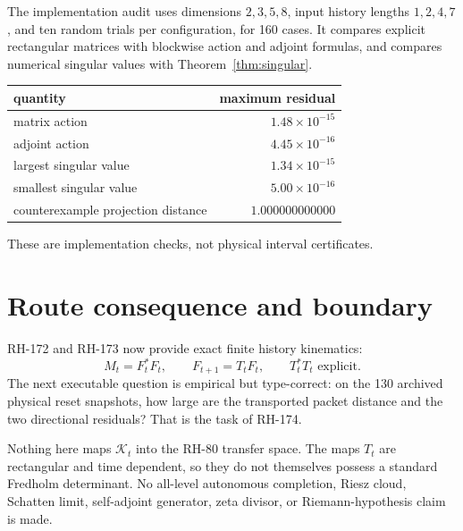\documentclass[12pt]{article}
\theoremstyle{definition}
\theoremstyle{remark}
\newcommand{\cK}{\mathcal K}
\begin{document}
The implementation audit uses dimensions $2,3,5,8$, input history lengths
$1,2,4,7$, and ten random trials per configuration, for 160 cases.  It
compares explicit rectangular matrices with blockwise action and adjoint
formulas, and compares numerical singular values with
Theorem~\ref{thm:singular}.
\begin{center}
\begin{tabular}{lr}
\toprule
quantity & maximum residual\\
\midrule
matrix action & $1.48\times10^{-15}$\\
adjoint action & $4.45\times10^{-16}$\\
largest singular value & $1.34\times10^{-15}$\\
smallest singular value & $5.00\times10^{-16}$\\
counterexample projection distance & $1.000000000000$\\
\bottomrule
\end{tabular}
\end{center}
These are implementation checks, not physical interval certificates.

\section{Route consequence and boundary}

RH-172 and RH-173 now provide exact finite history kinematics:
\[
 M_t=F_t^*F_t,
 \qquad F_{t+1}=T_tF_t,
 \qquad T_t^*T_t\text{ explicit}.
\]
The next executable question is empirical but type-correct: on the 130
archived physical reset snapshots, how large are the transported packet
distance and the two directional residuals?  That is the task of RH-174.

Nothing here maps $\cK_t$ into the RH-80 transfer space.  The maps $T_t$ are
rectangular and time dependent, so they do not themselves possess a standard
Fredholm determinant.  No all-level autonomous completion, Riesz cloud,
Schatten limit, self-adjoint generator, zeta divisor, or Riemann-hypothesis
claim is made.



\end{document}
